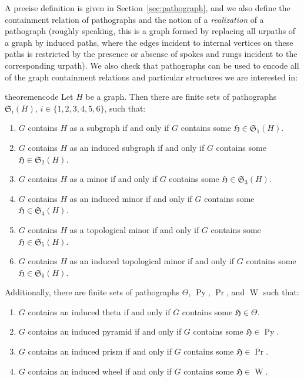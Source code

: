 \documentclass{article}
\newcommand{\Hf}{\mathfrak{H}}
\newcommand{\Sf}{\mathfrak{S}}
\DeclareMathOperator{\Py}{Py}
\DeclareMathOperator{\W}{W}
\begin{document}
A precise definition is given in Section~\ref{sec:pathograph}, and we also define the containment relation of pathographs and the notion of a \textit{realization} of a pathograph (roughly speaking, this is a graph formed by replacing all urpaths of a graph by induced paths, where the edges incident to internal vertices on these paths is restricted by the presence or absense of spokes and rungs incident to the corresponding urpath). We also check that pathographs can be used to encode all of the graph containment relations and particular structures we are interested in:

\begin{restatable}{theorem}{encode}\label{thm:encode}
Let $H$ be a graph. Then there are finite sets of pathographs
$\Sf_i(H)$, $i\in\{1,2,3,4,5,6\}$, such that:
\begin{enumerate}
    \item $G$ contains $H$ as a subgraph if and only if $G$ contains some $\Hf\in \Sf_1(H)$.
    \item $G$ contains $H$ as an induced subgraph if and only if $G$ contains some $\Hf\in \Sf_2(H)$.
    \item $G$ contains $H$ as a minor if and only if $G$ contains some $\Hf\in \Sf_3(H)$.
    \item $G$ contains $H$ as an induced minor if and only if $G$ contains some $\Hf\in \Sf_4(H)$.
    \item $G$ contains $H$ as a topological minor if and only if $G$ contains some $\Hf\in \Sf_5(H)$.
    \item $G$ contains $H$ as an induced topological minor if and only if $G$ contains some $\Hf\in \Sf_6(H)$.
\end{enumerate}

Additionally, there are finite sets of pathographs $\Theta$, $\Py$, $\Pr$, and $\W$ such that:
\begin{enumerate}[start=7]
    \item $G$ contains an induced theta if and only if $G$ contains some $\Hf\in\Theta$.
    \item $G$ contains an induced pyramid if and only if $G$ contains some $\Hf\in\Py$.
    \item $G$ contains an induced prism if and only if $G$ contains some $\Hf\in\Pr$.
    \item $G$ contains an induced wheel if and only if $G$ contains some $\Hf\in\W$.
\end{enumerate}
\end{restatable}
\end{document}
